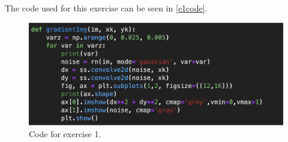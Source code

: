 The code used for this exercise can be seen in \autoref{e1code}.
\begin{figure}[H]
	\centering
	\includegraphics[width=0.7\linewidth]{Materials/e1code}
	\caption{Code for exercise 1.}
	\label{e1code}
\end{figure}